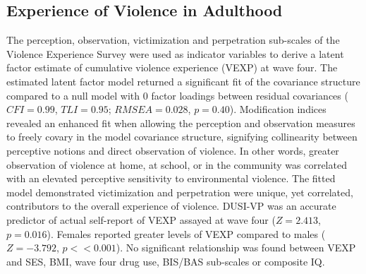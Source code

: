\documentclass[utf8]{frontiersSCNS} %
\begin{document}
\subsection{Experience of Violence in Adulthood} The perception, observation, victimization and perpetration sub-scales of the Violence Experience Survey were used as indicator variables to derive a latent factor estimate of cumulative violence experience (VEXP) at wave four. The estimated latent factor model returned a significant fit of the covariance structure compared to a null model with $0$ factor loadings between residual covariances ($CFI = 0.99$, $TLI = 0.95$; $RMSEA = 0.028$, $p = 0.40$). Modification indices revealed an enhanced fit when allowing the perception and observation measures to freely covary in the model covariance structure, signifying collinearity between perceptive notions and direct observation of violence. In other words, greater observation of violence at home, at school, or in the community was correlated with an elevated perceptive sensitivity to environmental violence. The fitted model demonstrated victimization and perpetration were unique, yet correlated, contributors to the overall experience of violence. DUSI-VP was an accurate predictor of actual self-report of VEXP assayed at wave four ($Z=2.413$, $p=0.016$). Females reported greater levels of VEXP compared to males ($Z=-3.792$, $p<<0.001$). No significant relationship was found between VEXP and SES, BMI, wave four drug use, BIS/BAS sub-scales or composite IQ.  

\end{document}

